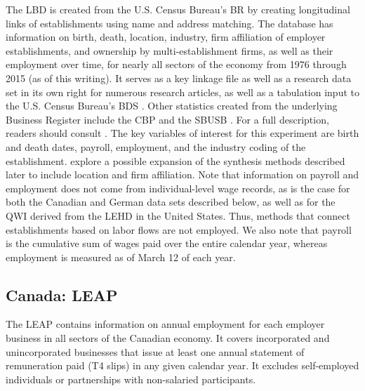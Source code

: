 \documentclass[10pt,twoside]{article}
\begin{document}
The \ac{LBD} \citep{LBD} is created from the U.S. Census Bureau's \ac{BR} by creating longitudinal links of establishments using name and address matching. The database has information on birth, death, location, industry,  firm  affiliation of employer establishments, and ownership by multi-establishment firms, as well as their employment over time, for nearly all sectors of the economy from 1976 through 2015 (as of this writing). It serves as a key linkage file as well as a research data set in its own right for numerous research articles, as well as a tabulation input to the U.S. Census Bureau's \acl{BDS} \citep[\acs{BDS}]{BDS}. Other statistics created from the underlying Business Register include the \acl{CBP} \citep[\acs{CBP}]{CBP} and the \acl{SBUSB} \citep[\acs{SBUSB}]{SBUSB}. For a full description, readers should consult  \citet{RePEc:cen:wpaper:02-17,}. The key variables of interest for this experiment are birth and death dates, payroll, employment, and the industry coding of the establishment.  \citet{SJIAOS-2014d} explore a possible expansion of the synthesis methods described later to include location and firm affiliation. Note that information on payroll and employment does not come from individual-level wage records, as is the case for both the Canadian and German data sets described below, as well as for the \acl{QWI} \citep{AbowdEtAl2009} derived from the \acl{LEHD} \citep[LEHD]{RePEc:cen:wpaper:18-27} in the United States. Thus, methods that connect establishments based on labor flows \citep{BenedettoEtAl2007,RePEc:iab:iabfme:201006_en} are not employed. We also note that payroll is the cumulative sum of wages paid over the entire calendar year, whereas employment is measured as of March 12 of each year.









 
\subsection{Canada: \acf{LEAP}}


The \ac{LEAP} \citep{StatisticsCanada2019} contains information on annual employment for each employer business in all sectors of the Canadian economy. It covers incorporated and unincorporated businesses that issue at least one annual statement of remuneration paid (T4 slips) in any given calendar year. It excludes self-employed individuals or partnerships with non-salaried participants.
\end{document}

